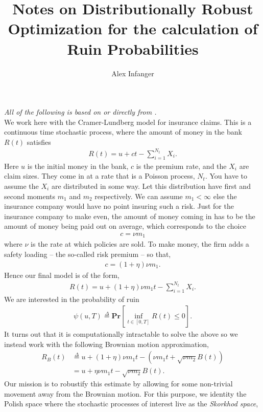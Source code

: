 \documentclass[12pt]{article}
\renewcommand{\Pr}{\textbf{Pr}}
\newcommand{\define}{\overset{\Delta}{=}}
\theoremstyle{definition}
\theoremstyle{definition}
\theoremstyle{definition}
\begin{document}
\title{Notes on Distributionally Robust Optimization for the calculation of Ruin Probabilities}
\author{Alex Infanger}
\maketitle
\emph{All of the following is based on or directly from \cite{JosePaper}.}\\


We work here with the Cramer-Lundberg model for insurance claims. This is a continuous time stochastic process, where the amount of money in the bank $R(t)$ satisfies
\begin{align*}
R(t)=u+ct-\sum_{i=1}^{N_t}X_i.
\end{align*}
Here $u$ is the initial money in the bank, $c$ is the premium rate, and the $X_i$ are claim sizes. They come in at a rate that is a Poisson process, $N_t$. You have to assume the $X_i$ are distributed in some way. Let this distribution have first and second moments $m_1$ and $m_2$ respectively. We can assume $m_1<\infty$ else the insurance company would have no point insuring such a risk. Just for the insurance company to make even, the amount of money coming in has to be the amount of money being paid out on average, which corresponds to the choice
\begin{align*}
c=\nu m_1
\end{align*}
where $\nu$ is the rate at which policies are sold. To make money, the firm adds a safety loading -- the so-called risk premium -- so that,
\begin{align*}
c=(1+\eta)\nu m_1.
\end{align*}
Hence our final model is of the form,
\begin{align*}
R(t)=u+(1+\eta)\nu m_1t-\sum_{i=1}^{N_t}X_i.
\end{align*}
We are interested in the probability of ruin
\begin{align*}
\psi(u,T)\define\Pr\left[\inf_{t\in[0,T]} R(t)\leq 0\right].
\end{align*}
It turns out that it is computationally intractable to solve the above so we instead work with the following Brownian motion approximation,
\begin{align*}
R_B(t)&\define u+(1+\eta)\nu m_1t - (\nu m_1t + \sqrt{\nu m_2}B(t))\\
&=u+\eta \nu m_1t-\sqrt{\nu m_2}B(t).
\end{align*}
Our mission is to robustify this estimate by allowing for some non-trivial movement away from the Brownian motion. For this purpose, we identity the Polish space where the stochastic processes of interest live as the \emph{Skorkhod space},
\end{document}
